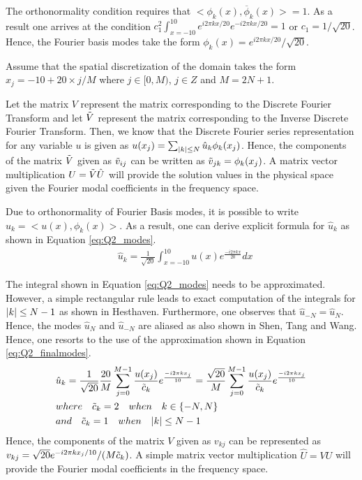 \documentclass[12pt]{article}
\DeclarePairedDelimiter\abs{\lvert}{\rvert}
\begin{document}
The orthonormality condition requires that $<\phi_k(x), \overline{\phi}_k(x)> = 1$. As a result one arrives at the condition $c_1^2 \int_{x = -10}^{10} e^{i 2\pi k x /20} e^{-i 2\pi k x /20} = 1$ or $c_1 = 1/\sqrt{20}$. Hence, the Fourier basis modes take the form $\phi_k(x) = e^{i 2 \pi k x /20}/\sqrt{20}$.

Assume that the spatial discretization of the domain takes the form $x_j = -10 + 20 \times j/M$ where $j \in [0, M)$, $j \in Z$ and $M = 2N + 1$. 

Let the matrix $V$ represent the matrix corresponding to the Discrete Fourier Transform and let $\Tilde{V}$ represent the matrix corresponding to the Inverse Discrete Fourier Transform. Then, we know that the Discrete Fourier series representation for any variable $u$ is given as $u(x_j) = \sum_{\abs{k} \leq N} \hat{u}_k \phi_k(x_j)$. Hence, the components of the matrix $\Tilde{V}$ given as $\Tilde{v}_{ij}$ can be written as $\Tilde{v}_{jk} = \phi_k(x_j)$. A matrix vector multiplication $U = \Tilde{V} \hat{U}$ will provide the solution values in the physical space given the Fourier modal coefficients in the frequency space. 

Due to orthonormality of Fourier Basis modes, it is possible to write $\hat{u}_k = <u(x), \phi_k(x)>$. As a result, one can derive explicit formula for $\hat{u}_k$ as shown in Equation \ref{eq:Q2_modes}.
\begin{equation}
    \begin{aligned}
        & \hat{u}_k = \frac{1}{\sqrt{20}} \int_{x = -10}^{10} u(x) e^{\frac{-i 2 \pi k x}{20}} dx 
    \end{aligned}
\label{eq:Q2_modes}
\end{equation}

The integral shown in Equation \ref{eq:Q2_modes} needs to be approximated. However, a simple rectangular rule leads to exact computation of the integrals for $\abs{k} \leq N - 1$ as shown in Hesthaven. Furthermore, one observes that $\hat{u}_{-N} = \hat{u}_{N}$. Hence, the modes $\hat{u}_N$ and $\hat{u}_{-N}$ are aliased as also shown in Shen, Tang and Wang. Hence, one resorts to the use of the approximation shown in Equation \ref{eq:Q2_finalmodes}.
\begin{equation}
    \begin{aligned}
        & \hat{u}_k = \frac{1}{\sqrt{20}} \frac{20}{M} \sum_{j = 0}^{M - 1} \frac{u(x_j)}{\Tilde{c}_k} e^{\frac{-i 2 \pi k x_j}{10}} =   \frac{\sqrt{20}}{M} \sum_{j = 0}^{M - 1} \frac{u(x_j)}{\Tilde{c}_k} e^{\frac{-i 2 \pi k x_j}{10}} \\
        & where \quad \Tilde{c}_k = 2 \quad when \quad  k \in \{ -N, N \} \\
        & and \quad  \Tilde{c}_k = 1 \quad when \quad \abs{k} \leq N - 1
    \end{aligned}
    \label{eq:Q2_finalmodes}
\end{equation}
Hence, the components of the matrix $V$ given as $v_{kj}$ can be represented as $v_{kj} = \sqrt{20} e^{-i 2 \pi k x_j/10}/(M \Tilde{c}_k)$. A simple matrix vector multiplication $\hat{U} = VU$ will provide the Fourier modal coefficients in the frequency space.
\end{document}
